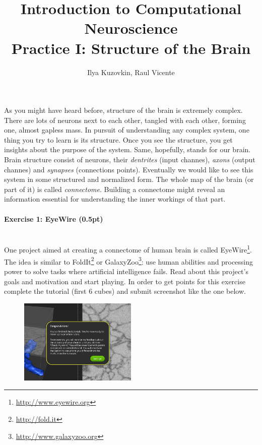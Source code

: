 \documentclass[a4paper,11pt]{article}
\author{\large{Ilya Kuzovkin, Raul Vicente}}
\title{\huge{Introduction to Computational Neuroscience}\\\LARGE{Practice I: Structure of the Brain}}
\newenvironment{exercise}[3]{\paragraph{Exercise #1: #2 (#3pt)}\ \\}{
\medskip}
\begin{document}
\maketitle

As you might have heard before, structure of the brain is extremely complex. There are lots of neurons next to each other, tangled with each other, forming one, almost gapless mass. In pursuit of understanding any complex system, one thing you try to learn is its structure. Once you see the structure, you get insights about the purpose of the system. Same, hopefully, stands for our brain. Brain structure consist of neurons, their \emph{dentrites} (input channes), \emph{axons} (output channes) and \emph{synapses} (connections points). Eventually we would like to see this system in some structured and normalized form. The whole map of the brain (or part of it) is called \emph{connectome}. Building a connectome might reveal an information essential for understanding the inner workings of that part. 

\begin{exercise}{1}{EyeWire}{0.5}
One project aimed at creating a connectome of human brain is called EyeWire\footnote{\url{http://www.eyewire.org}}. The idea is similar to FoldIt\footnote{\url{http://fold.it}} or GalaxyZoo\footnote{\url{http://www.galaxyzoo.org}}: use human abilities and processing power to solve tasks where artificial intelligence fails. Read about this project's goals and motivation and start playing. In order to get points for this exercise complete the tutorial (first 6 cubes) and submit screenshot like the one below.
\begin{figure}[htbp]
   \centering
   \includegraphics[width=0.5\textwidth]{eyewire.png} 
\end{figure}
\end{exercise}
\end{document}
